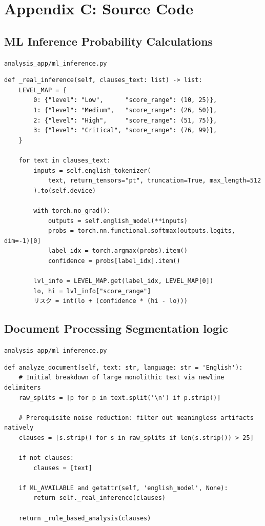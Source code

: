 \documentclass[a4paper,12pt]{report}
\begin{document}
\vspace{1cm}
\section*{Appendix C: Source Code}

\subsection*{ML Inference Probability Calculations}
\texttt{analysis\_app/ml\_inference.py}

\begin{lstlisting}[caption={PyTorch Inference mapping via HuggingFace framework}]
def _real_inference(self, clauses_text: list) -> list:
    LEVEL_MAP = {
        0: {"level": "Low",      "score_range": (10, 25)},
        1: {"level": "Medium",   "score_range": (26, 50)},
        2: {"level": "High",     "score_range": (51, 75)},
        3: {"level": "Critical", "score_range": (76, 99)},
    }
    
    for text in clauses_text:
        inputs = self.english_tokenizer(
            text, return_tensors="pt", truncation=True, max_length=512
        ).to(self.device)
        
        with torch.no_grad():
            outputs = self.english_model(**inputs)
            probs = torch.nn.functional.softmax(outputs.logits, dim=-1)[0]
            label_idx = torch.argmax(probs).item()
            confidence = probs[label_idx].item()
            
        lvl_info = LEVEL_MAP.get(label_idx, LEVEL_MAP[0])
        lo, hi = lvl_info["score_range"]
        リスク = int(lo + (confidence * (hi - lo)))
\end{lstlisting}


\subsection*{Document Processing Segmentation logic}
\texttt{analysis\_app/ml\_inference.py}

\begin{lstlisting}[caption={Basic raw paragraph text segmentation pipeline filtration}]
def analyze_document(self, text: str, language: str = 'English'):
    # Initial breakdown of large monolithic text via newline delimiters
    raw_splits = [p for p in text.split('\n') if p.strip()]
    
    # Prerequisite noise reduction: filter out meaningless artifacts natively
    clauses = [s.strip() for s in raw_splits if len(s.strip()) > 25]
    
    if not clauses:
        clauses = [text]
        
    if ML_AVAILABLE and getattr(self, 'english_model', None):
        return self._real_inference(clauses)
    
    return _rule_based_analysis(clauses)

\end{lstlisting}
\end{document}
